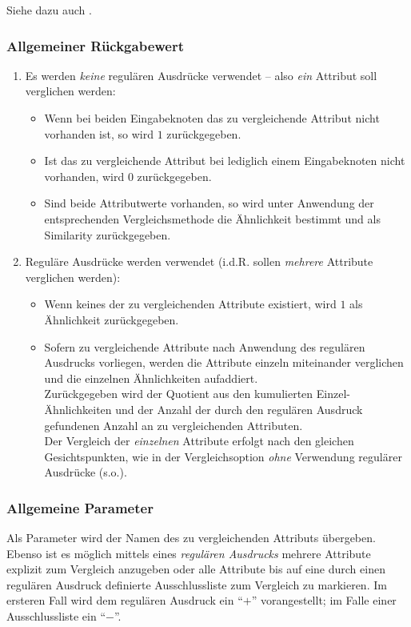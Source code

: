 Siehe dazu auch .

\subsubsection*{Allgemeiner Rückgabewert}
\begin{enumerate}
	\item Es werden \emph{keine} regulären Ausdrücke verwendet – also \emph{ein} Attribut soll verglichen werden:
		\begin{itemize}
			\item Wenn bei beiden Eingabeknoten das zu vergleichende Attribut nicht vorhanden ist, so wird $1$ zurückgegeben.
			\item Ist das zu vergleichende Attribut bei lediglich einem Eingabeknoten nicht vorhanden, wird $0$ zurückgegeben.
			\item Sind beide Attributwerte vorhanden, so wird unter Anwendung der entsprechenden Vergleichsmethode die Ähnlichkeit bestimmt und als Similarity zurückgegeben.
		\end{itemize}
	\item Reguläre Ausdrücke werden verwendet (i.d.R. sollen \emph{mehrere} Attribute verglichen werden):
		\begin{itemize}
			\item Wenn keines der zu vergleichenden Attribute existiert, wird $1$ als Ähnlichkeit zurückgegeben.
			\item Sofern zu vergleichende Attribute nach Anwendung des regulären Ausdrucks vorliegen, werden die Attribute einzeln miteinander verglichen und die einzelnen Ähnlichkeiten aufaddiert.\\
			Zurückgegeben wird der Quotient aus den kumulierten Einzel-Ähnlichkeiten und der Anzahl der durch den regulären Ausdruck gefundenen Anzahl an zu vergleichenden Attributen.\\
			 Der Vergleich der \emph{einzelnen} Attribute erfolgt nach den gleichen Gesichtspunkten, wie in der Vergleichsoption \emph{ohne} Verwendung regulärer Ausdrücke (s.o.).
		\end{itemize}
\end{enumerate}

\subsubsection*{Allgemeine Parameter}
Als Parameter wird der Namen des zu vergleichenden Attributs übergeben.\\
Ebenso ist es möglich mittels eines \emph{regulären Ausdrucks} mehrere Attribute explizit zum Vergleich anzugeben oder alle Attribute bis auf eine durch einen regulären Ausdruck definierte Ausschlussliste zum Vergleich zu markieren. Im ersteren Fall wird dem regulären Ausdruck ein "`$+$"' vorangestellt; im Falle einer Ausschlussliste ein "`$-$"'.

